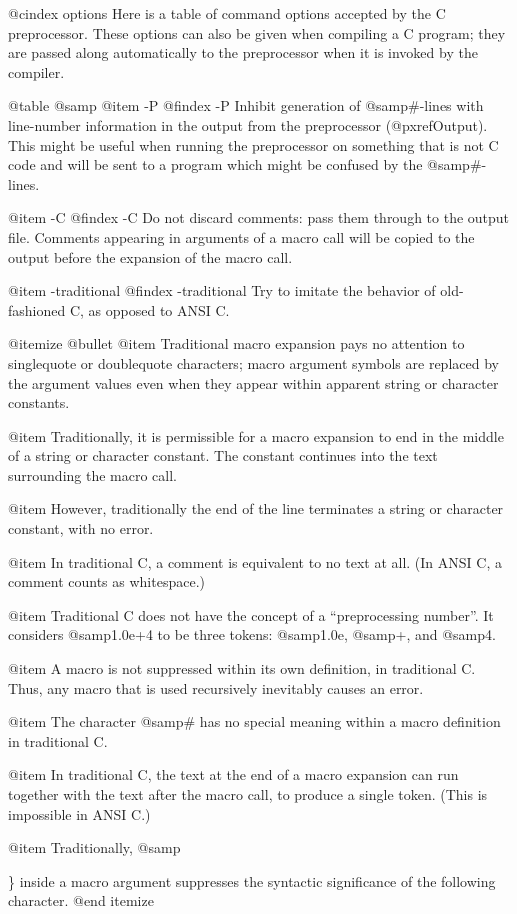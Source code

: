{{@cindex options
Here is a table of command options accepted by the C preprocessor.
These options can also be given when compiling a C program; they are
passed along automatically to the preprocessor when it is invoked by the
compiler.

@table @samp
@item -P
@findex -P
Inhibit generation of @samp{#}-lines with line-number information in
the output from the preprocessor (@pxref{Output}).  This might be
useful when running the preprocessor on something that is not C code
and will be sent to a program which might be confused by the
@samp{#}-lines.

@item -C
@findex -C
Do not discard comments: pass them through to the output file.
Comments appearing in arguments of a macro call will be copied to the
output before the expansion of the macro call.

@item -traditional
@findex -traditional
Try to imitate the behavior of old-fashioned C, as opposed to ANSI C.

@itemize @bullet
@item
Traditional macro expansion pays no attention to singlequote or
doublequote characters; macro argument symbols are replaced by the
argument values even when they appear within apparent string or
character constants.

@item
Traditionally, it is permissible for a macro expansion to end in the
middle of a string or character constant.  The constant continues into
the text surrounding the macro call.

@item
However, traditionally the end of the line terminates a string or
character constant, with no error.

@item
In traditional C, a comment is equivalent to no text at all.  (In ANSI
C, a comment counts as whitespace.)

@item
Traditional C does not have the concept of a ``preprocessing number''.
It considers @samp{1.0e+4} to be three tokens: @samp{1.0e}, @samp{+},
and @samp{4}.

@item
A macro is not suppressed within its own definition, in traditional C.
Thus, any macro that is used recursively inevitably causes an error.

@item
The character @samp{#} has no special meaning within a macro definition
in traditional C.

@item
In traditional C, the text at the end of a macro expansion can run
together with the text after the macro call, to produce a single token.
(This is impossible in ANSI C.)

@item
Traditionally, @samp{\} inside a macro argument suppresses the syntactic
significance of the following character.
@end itemize

}}}
